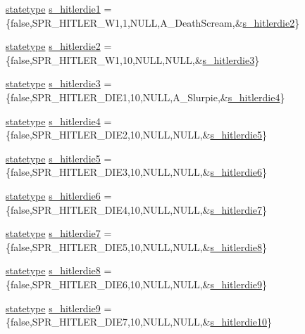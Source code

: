 \begin{DoxyCompactItemize}
\item 
\hyperlink{structstatestruct}{statetype} \hyperlink{WL__ACT2_8C_ad89c60be5f4190ae1c95e96b3eff37d2}{s\_\-hitlerdie1} = \{false,SPR\_\-HITLER\_\-W1,1,NULL,A\_\-DeathScream,\&\hyperlink{WL__ACT2_8C_a689a9a34510c375d3e7baf3e44a306b1}{s\_\-hitlerdie2}\}
\item 
\hyperlink{structstatestruct}{statetype} \hyperlink{WL__ACT2_8C_a689a9a34510c375d3e7baf3e44a306b1}{s\_\-hitlerdie2} = \{false,SPR\_\-HITLER\_\-W1,10,NULL,NULL,\&\hyperlink{WL__ACT2_8C_a77cb0b9a6adb6ce65957e289cc3b84d5}{s\_\-hitlerdie3}\}
\item 
\hyperlink{structstatestruct}{statetype} \hyperlink{WL__ACT2_8C_a77cb0b9a6adb6ce65957e289cc3b84d5}{s\_\-hitlerdie3} = \{false,SPR\_\-HITLER\_\-DIE1,10,NULL,A\_\-Slurpie,\&\hyperlink{WL__ACT2_8C_af74ae97c693e181be0050cce42a41a60}{s\_\-hitlerdie4}\}
\item 
\hyperlink{structstatestruct}{statetype} \hyperlink{WL__ACT2_8C_af74ae97c693e181be0050cce42a41a60}{s\_\-hitlerdie4} = \{false,SPR\_\-HITLER\_\-DIE2,10,NULL,NULL,\&\hyperlink{WL__ACT2_8C_a47e06b78249d62db7664e0362889bdbe}{s\_\-hitlerdie5}\}
\item 
\hyperlink{structstatestruct}{statetype} \hyperlink{WL__ACT2_8C_a47e06b78249d62db7664e0362889bdbe}{s\_\-hitlerdie5} = \{false,SPR\_\-HITLER\_\-DIE3,10,NULL,NULL,\&\hyperlink{WL__ACT2_8C_aa9a8ed6fdfd07ba027b5c2568b1b0825}{s\_\-hitlerdie6}\}
\item 
\hyperlink{structstatestruct}{statetype} \hyperlink{WL__ACT2_8C_aa9a8ed6fdfd07ba027b5c2568b1b0825}{s\_\-hitlerdie6} = \{false,SPR\_\-HITLER\_\-DIE4,10,NULL,NULL,\&\hyperlink{WL__ACT2_8C_ae016f49d180a3ef7c99c14fbfa4b1fc2}{s\_\-hitlerdie7}\}
\item 
\hyperlink{structstatestruct}{statetype} \hyperlink{WL__ACT2_8C_ae016f49d180a3ef7c99c14fbfa4b1fc2}{s\_\-hitlerdie7} = \{false,SPR\_\-HITLER\_\-DIE5,10,NULL,NULL,\&\hyperlink{WL__ACT2_8C_a8ce15e6926d801bf196772f292046b0f}{s\_\-hitlerdie8}\}
\item 
\hyperlink{structstatestruct}{statetype} \hyperlink{WL__ACT2_8C_a8ce15e6926d801bf196772f292046b0f}{s\_\-hitlerdie8} = \{false,SPR\_\-HITLER\_\-DIE6,10,NULL,NULL,\&\hyperlink{WL__ACT2_8C_a91aed7b902a5a6034d1189f16f5e513d}{s\_\-hitlerdie9}\}
\item 
\hyperlink{structstatestruct}{statetype} \hyperlink{WL__ACT2_8C_a91aed7b902a5a6034d1189f16f5e513d}{s\_\-hitlerdie9} = \{false,SPR\_\-HITLER\_\-DIE7,10,NULL,NULL,\&\hyperlink{WL__ACT2_8C_a248fc0709b6d2aae2cb7e042c095079f}{s\_\-hitlerdie10}\}
\item 

\end{DoxyCompactItemize}
